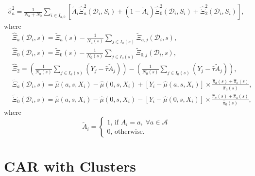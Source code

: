 \documentclass{article}
\begin{document}
\begin{align}
	\hat{\sigma}_a^2 = \frac{1}{N_a + N_0} \sum_{i \in I_{a,0}} \left[\tilde{A}_i\hat{\Xi}_{a}^2(\mathcal D_i, S_i) + (1-\tilde{A}_i) \hat{\Xi}_{0}^2(\mathcal D_i, S_i) + \hat{\Xi}_2^2(\mathcal D_i, S_i)\right], \nonumber
\end{align}
where 
\begin{align}
	&\hat{\Xi}_{a}(\mathcal D_i, s) = \tilde{\Xi}_{a}(s) - \frac{1}{N_a(s)} \sum_{j \in I_a(s)} \tilde{\Xi}_{a,j}(\mathcal D_i, s) \nonumber, \\
	&\hat{\Xi}_{0}(\mathcal D_i, s) = \tilde{\Xi}_{0}(s) - \frac{1}{N_0(s)} \sum_{j \in I_0(s)} \tilde{\Xi}_{0,j}(\mathcal D_i, s) \nonumber , \\
	& \hat{\Xi}_2 = \left(\frac{1}{N_a(s)} \sum_{j \in I_a(s)} (Y_j - \hat{\tau} \tilde{A}_j) \right) - \left(\frac{1}{N_0(s)} \sum_{j \in I_0(s)} (Y_j - \hat{\tau} \tilde{A}_j)\right), \nonumber \\
	& \tilde{\Xi}_a(\mathcal D_i,s) = \hat{\mu}(a,s,X_i) - \hat{\mu}(0,s,X_i) + \left[Y_i - \hat{\mu}(a,s,X_i)\right] \times \frac{\hat{\pi}_a(s) + \hat{\pi}_o(s)}{\hat{\pi}_a(s)}, \nonumber \\
& \tilde{\Xi}_0(\mathcal D_i,s) = \hat{\mu}(a,s,X_i) - \hat{\mu}(0,s,X_i) - \left[Y_i - \hat{\mu}(0,s,X_i)\right] \times \frac{\hat{\pi}_a(s) + \hat{\pi}_o(s)}{\hat{\pi}_0(s)}, \nonumber
\end{align}
where 
\[\tilde{A}_i = \begin{cases}1\text{, if }A_i = a,\; \forall a \in \mathcal A \\ 0\text{, otherwise.}\end{cases}\]


\section{CAR with Clusters}
\end{document}

